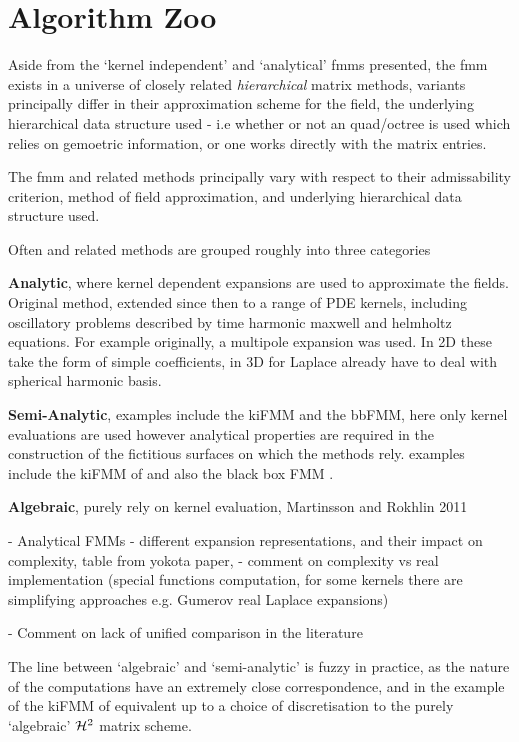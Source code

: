 
\section{Algorithm Zoo}\label{chpt:fmm:sec:algorithm_zoo}

Aside from the `kernel independent' and `analytical' \glspl{fmm} presented, the \acrshort{fmm} exists in a universe of closely related \textit{hierarchical} matrix methods, variants principally differ in their approximation scheme for the field, the underlying hierarchical data structure used - i.e whether or not an quad/octree is used which relies on gemoetric information, or one works directly with the matrix entries.

The \acrshort{fmm} and related methods principally vary with respect to their admissability criterion, method of field approximation, and underlying hierarchical data structure used.

Often  and related methods are grouped roughly into three categories

\textbf{Analytic}, where kernel dependent expansions are used to approximate the fields. Original method, extended since then to a range of PDE kernels, including oscillatory problems described by time harmonic maxwell and helmholtz equations. For example originally, a multipole expansion was used. In 2D these take the form of simple coefficients, in 3D for Laplace already have to deal with spherical harmonic basis.

\textbf{Semi-Analytic}, examples include the kiFMM and the bbFMM, here only kernel evaluations are used however analytical properties are required in the construction of the fictitious surfaces on which the methods rely. examples include the kiFMM of \cite{Ying:2004:JCP} and also the black box FMM \cite{fong2009black}.

\textbf{Algebraic}, purely rely on kernel evaluation, Martinsson and Rokhlin 2011 \cite{martinsson2007accelerated}

- Analytical FMMs
- different expansion representations, and their impact on complexity, table from yokota paper,
- comment on complexity vs real implementation (special functions computation, for some kernels there are simplifying approaches e.g. Gumerov real Laplace expansions)

- Comment on lack of unified comparison in the literature

The line between `algebraic' and `semi-analytic' is fuzzy in practice, as the nature of the computations have an extremely close correspondence, and in the example of the kiFMM of \cite{Ying:2004:JCP} equivalent up to a choice of discretisation to the purely `algebraic' $\mathcal{H}^2$ matrix scheme.

